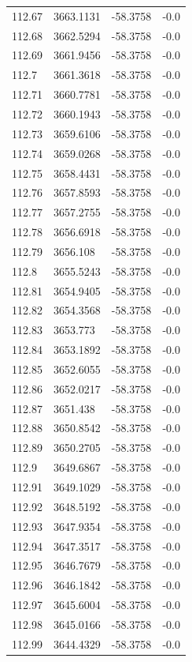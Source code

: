 \begin{table}[H]
\begin{tabular}{llll}
112.67 & 3663.1131 & -58.3758 & -0.0 \\
112.68 & 3662.5294 & -58.3758 & -0.0 \\
112.69 & 3661.9456 & -58.3758 & -0.0 \\
112.7 & 3661.3618 & -58.3758 & -0.0 \\
112.71 & 3660.7781 & -58.3758 & -0.0 \\
112.72 & 3660.1943 & -58.3758 & -0.0 \\
112.73 & 3659.6106 & -58.3758 & -0.0 \\
112.74 & 3659.0268 & -58.3758 & -0.0 \\
112.75 & 3658.4431 & -58.3758 & -0.0 \\
112.76 & 3657.8593 & -58.3758 & -0.0 \\
112.77 & 3657.2755 & -58.3758 & -0.0 \\
112.78 & 3656.6918 & -58.3758 & -0.0 \\
112.79 & 3656.108 & -58.3758 & -0.0 \\
112.8 & 3655.5243 & -58.3758 & -0.0 \\
112.81 & 3654.9405 & -58.3758 & -0.0 \\
112.82 & 3654.3568 & -58.3758 & -0.0 \\
112.83 & 3653.773 & -58.3758 & -0.0 \\
112.84 & 3653.1892 & -58.3758 & -0.0 \\
112.85 & 3652.6055 & -58.3758 & -0.0 \\
112.86 & 3652.0217 & -58.3758 & -0.0 \\
112.87 & 3651.438 & -58.3758 & -0.0 \\
112.88 & 3650.8542 & -58.3758 & -0.0 \\
112.89 & 3650.2705 & -58.3758 & -0.0 \\
112.9 & 3649.6867 & -58.3758 & -0.0 \\
112.91 & 3649.1029 & -58.3758 & -0.0 \\
112.92 & 3648.5192 & -58.3758 & -0.0 \\
112.93 & 3647.9354 & -58.3758 & -0.0 \\
112.94 & 3647.3517 & -58.3758 & -0.0 \\
112.95 & 3646.7679 & -58.3758 & -0.0 \\
112.96 & 3646.1842 & -58.3758 & -0.0 \\
112.97 & 3645.6004 & -58.3758 & -0.0 \\
112.98 & 3645.0166 & -58.3758 & -0.0 \\
112.99 & 3644.4329 & -58.3758 & -0.0 \\

\end{tabular}
\end{table}
